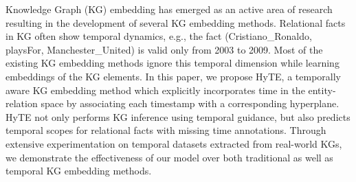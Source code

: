 Knowledge Graph (KG) embedding has emerged as an active area of research resulting in the development of several KG embedding methods. Relational facts in KG often show temporal dynamics, e.g., the fact (Cristiano\_Ronaldo, playsFor, Manchester\_United) is valid only from 2003 to 2009. Most of the existing KG embedding methods ignore this temporal dimension while learning embeddings of the KG elements. In this paper, we propose HyTE, a temporally aware KG embedding method which explicitly incorporates time in the entity-relation space by associating each timestamp with a corresponding hyperplane. HyTE not only performs KG inference using temporal guidance, but also predicts temporal scopes for relational facts with missing time annotations. Through extensive experimentation on temporal datasets extracted from real-world KGs, we demonstrate the effectiveness of our model over both traditional as well as temporal KG embedding methods.
